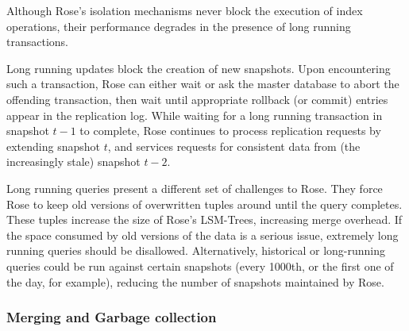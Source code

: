 \documentclass{vldb}
\newcommand{\rows}{Rose\xspace}
\newcommand{\rowss}{Rose's\xspace}
\begin{document}
Although \rowss isolation mechanisms never block the execution of
index operations, their performance degrades in the presence of long
running transactions.

Long running updates block the creation of new snapshots.  Upon
encountering such a transaction, \rows can either wait or ask the
master database to abort the offending transaction, then wait until
appropriate rollback (or commit) entries appear in the replication
log.  While waiting for a long running transaction in snapshot $t-1$
to complete, \rows continues to process replication requests by
extending snapshot $t$, and services requests for consistent data from
(the increasingly stale) snapshot $t-2$.



Long running queries present a different set of challenges to \rows.
They force \rows to keep old versions of overwritten tuples around
until the query completes.  These tuples increase the size of \rowss
LSM-Trees, increasing merge overhead.  If the space consumed by old
versions of the data is a serious issue, extremely long running
queries should be disallowed.  Alternatively, historical or
long-running queries could be run against certain snapshots (every
1000th, or the first one of the day, for example), reducing the
number of snapshots maintained by \rows.

\subsubsection{Merging and Garbage collection}
\end{document}
